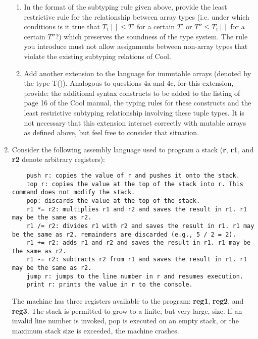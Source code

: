 \documentclass[11pt]{article}
\begin{document}
\begin{enumerate}
\begin{enumerate}
    \item In the format of the subtyping rule given above, provide the least restrictive rule for the relationship between array types (i.e. under which conditions is it true that $T_1[ ] \leq T'$ for a certain $T'$ or $T'' \leq T_1[ ]$ for a certain $T''$?) which preserves the soundness of the type system. The rule you introduce must not allow assignments between non-array types that violate the existing subtyping relations of Cool.\\
        \newpage
    \item Add another extension to the language for immutable arrays (denoted by the type T()). Analogous to questions 4a and 4c, for this extension, provide: the additional syntax constructs to be added to the listing of page 16 of the Cool manual, the typing rules for these constructs and the least restrictive subtyping relationship involving these tuple types. It is not necessary that this extension interact correctly with mutable arrays as defined above, but feel free to consider that situation. \\
        \newpage
  \end{enumerate}
  \newpage
  \item Consider the following assembly language used to program a stack (\textbf{r}, \textbf{r1}, and \textbf{r2} denote arbitrary registers):\\
   \begin{lstlisting}
    push r: copies the value of r and pushes it onto the stack.
    top r: copies the value at the top of the stack into r. This command does not modify the stack.
    pop: discards the value at the top of the stack.
    r1 *= r2: multiplies r1 and r2 and saves the result in r1. r1 may be the same as r2.
    r1 /= r2: divides r1 with r2 and saves the result in r1. r1 may be the same as r2. remainders are discarded (e.g., 5 / 2 = 2).
    r1 += r2: adds r1 and r2 and saves the result in r1. r1 may be the same as r2.
    r1 -= r2: subtracts r2 from r1 and saves the result in r1. r1 may be the same as r2.
    jump r: jumps to the line number in r and resumes execution.
    print r: prints the value in r to the console.
  \end{lstlisting}
  The machine has three registers available to the program: \textbf{reg1}, \textbf{reg2}, and \textbf{reg3}. The stack is permitted to grow to a finite, but very large, size. If an invalid line number is invoked, pop is executed on an empty stack, or the maximum stack size is exceeded, the machine crashes.
  

\end{enumerate}
\end{document}
